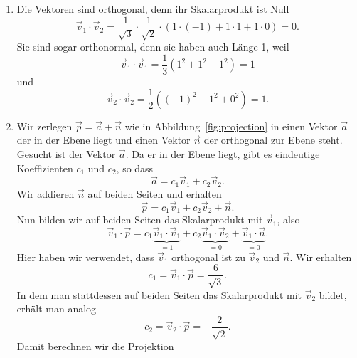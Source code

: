 \begin{losung}
	\begin{enumerate}[label=(\alph*)]
		\item Die Vektoren sind orthogonal, denn ihr Skalarprodukt ist Null
		\begin{equation*}
			\vec v_1\cdot\vec v_2= \frac{1}{\sqrt{3}}\cdot\frac{1}{\sqrt{2}}\cdot\left(1\cdot\left(-1\right)+1\cdot 1+1\cdot 0\right)=0.
		\end{equation*}
		Sie sind sogar orthonormal, denn sie haben auch Länge 1, weil
		\begin{equation*}
			\vec v_1\cdot\vec v_1=\frac{1}{3}\left(1^2+1^2+1^2\right)=1
		\end{equation*}
		und
		\begin{equation*}
			\vec v_2\cdot\vec v_2=\frac{1}{2}\left(\left(-1\right)^2+1^2+0^2\right)=1.
		\end{equation*}
		\item Wir zerlegen $\vec p=\vec a+\vec n$ wie in Abbildung~\ref{fig:projection} in einen Vektor $\vec a$ der in der Ebene liegt und einen Vektor $\vec n$ der orthogonal zur Ebene steht.
		Gesucht ist der Vektor $\vec a$.
		Da er in der Ebene liegt, gibt es eindeutige Koeffizienten $c_1$ und $c_2$, so dass
		\begin{equation*}
			\vec a=c_1\vec v_1+c_2\vec v_2.
		\end{equation*}
		Wir addieren $\vec n$ auf beiden Seiten und erhalten
		\begin{equation*}
			\vec p=c_1\vec v_1+c_2\vec v_2+\vec n.
		\end{equation*}
		Nun bilden wir auf beiden Seiten das Skalarprodukt mit $\vec v_1$, also
		\begin{equation*}
			\vec v_1\cdot\vec p=c_1\underbrace{\vec v_1\cdot\vec v_1}_{=1}+c_2\underbrace{\vec v_1\cdot\vec v_2}_{=0}+\underbrace{\vec v_1\cdot\vec n}_{=0}.
		\end{equation*}
		Hier haben wir verwendet, dass $\vec v_1$ orthogonal ist zu $\vec v_2$ und $\vec n$.
		Wir erhalten
		\begin{equation*}
			c_1=\vec v_1\cdot\vec p=\frac{6}{\sqrt{3}}.
		\end{equation*}
		In dem man stattdessen auf beiden Seiten das Skalarprodukt mit $\vec v_2$ bildet, erhält man analog
		\begin{equation*}
			c_2=\vec v_2\cdot\vec p=-\frac{2}{\sqrt{2}}.
		\end{equation*}
		Damit berechnen wir die Projektion
		\begin{equation*}

\end{equation*}
\end{enumerate}
\end{losung}
